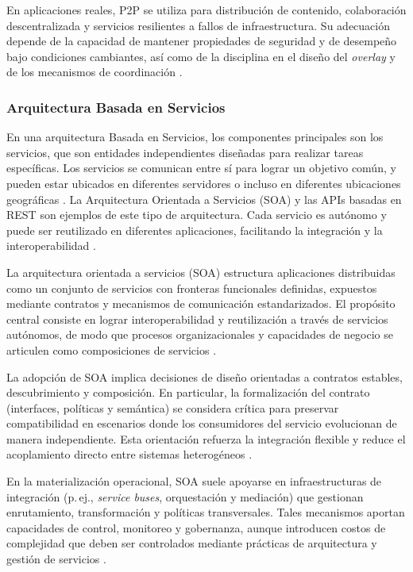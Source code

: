 				En aplicaciones reales, P2P se utiliza para distribución de contenido, colaboración descentralizada y servicios resilientes a fallos de infraestructura. Su adecuación depende de la capacidad de mantener propiedades de seguridad y de desempeño bajo condiciones cambiantes, así como de la disciplina en el diseño del \textit{overlay} y de los mecanismos de coordinación \cite{Masinde2020PeerToPeer}.
				

			\subsubsection{Arquitectura Basada en Servicios}
				\noindent
				En una arquitectura Basada en Servicios, los componentes principales son los servicios, que son entidades independientes diseñadas para realizar tareas específicas. Los servicios se comunican entre sí para lograr un objetivo común, y pueden estar ubicados en diferentes servidores o incluso en diferentes ubicaciones geográficas \cite{Zeng2012distributed,Hogie2023}. La Arquitectura Orientada a Servicios (SOA) y las APIs basadas en REST son ejemplos de este tipo de arquitectura. Cada servicio es autónomo y puede ser reutilizado en diferentes aplicaciones, facilitando la integración y la interoperabilidad \cite{Devin2020,Ahmad2023,Hogie2023}.
				
				La arquitectura orientada a servicios (SOA) estructura aplicaciones distribuidas como un conjunto de servicios con fronteras funcionales definidas, expuestos mediante contratos y mecanismos de comunicación estandarizados. El propósito central consiste en lograr interoperabilidad y reutilización a través de servicios autónomos, de modo que procesos organizacionales y capacidades de negocio se articulen como composiciones de servicios \cite{Niknejad2020Understanding}.
				
				La adopción de SOA implica decisiones de diseño orientadas a contratos estables, descubrimiento y composición. En particular, la formalización del contrato (interfaces, políticas y semántica) se considera crítica para preservar compatibilidad en escenarios donde los consumidores del servicio evolucionan de manera independiente. Esta orientación refuerza la integración flexible y reduce el acoplamiento directo entre sistemas heterogéneos \cite{Niknejad2020Understanding}.
				
				En la materialización operacional, SOA suele apoyarse en infraestructuras de integración (p.\,ej., \textit{service buses}, orquestación y mediación) que gestionan enrutamiento, transformación y políticas transversales. Tales mecanismos aportan capacidades de control, monitoreo y gobernanza, aunque introducen costos de complejidad que deben ser controlados mediante prácticas de arquitectura y gestión de servicios \cite{Niknejad2020Understanding}.
				
